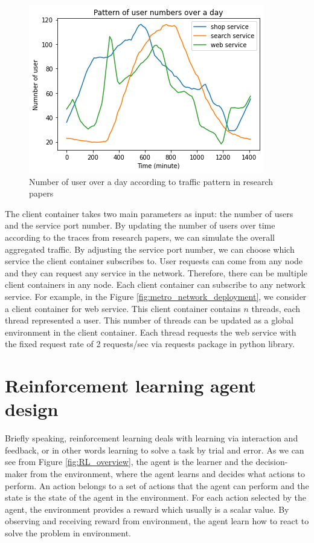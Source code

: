 \documentclass[conference]{IEEEtran}
\begin{document}
\begin{figure}[]
    \centering
    \includegraphics[scale = 0.55]{imgs/user_pattern_a_day.png}
    \caption{Number of user over a day according to traffic pattern in research papers}
    \label{fig:user_pattern}
\end{figure}

The client container takes two main parameters as input: the number of users and the service port number. By updating the number of users over time according to the traces from research papers, we can simulate the overall aggregated traffic. By adjusting the service port number, we can choose which service the client container subscribes to. User requests can come from any node and they can request any service in the network. Therefore, there can be multiple client containers in any node. Each client container can subscribe to any network service. For example, in the Figure \ref{fig:metro_network_deployment}, we consider a client container for web service. This client container contains $n$ threads, each thread represented a user. This number of threads can be updated as a global environment in the client container. Each thread requests the web service with the fixed request rate of 2 requests/sec via requests package in python library.



\section{Reinforcement learning agent design}
\label{sec:RL_Agent}
Briefly speaking, reinforcement learning deals with learning via interaction and feedback, or in other words learning to solve a task by trial and error. As we can see from Figure \ref{fig:RL_overview}, the agent is the learner and the decision-maker from the environment, where the agent learns and decides what actions to perform. An action belongs to a set of actions that the agent can perform and the state is the state of the agent in the environment. For each action selected by the agent, the environment provides a reward which usually is a scalar value. By observing and receiving reward from environment, the agent learn how to react to solve the problem in environment. 
\end{document}
